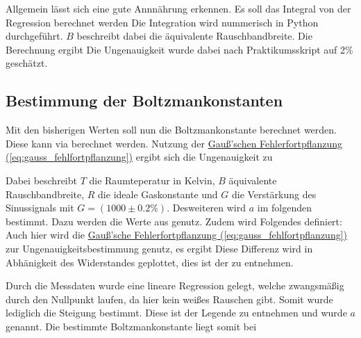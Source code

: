 Allgemein lässt sich eine gute Annnährung erkennen. Es soll das Integral von der Regression berechnet werden
Die Integration wird nummerisch in Python durchgeführt. $B$ beschreibt dabei die äquivalente Rauschbandbreite. Die Berechnung ergibt
Die Ungenauigkeit wurde dabei nach Praktikumsskript auf 2\% geschätzt. \cite{skriptPAP22}

\subsection{Bestimmung der Boltzmankonstanten}
Mit den bisherigen Werten soll nun die Boltzmankonstante berechnet werden.
Diese kann via 
berechnet werden. Nutzung der \hyperref[eq:gauss_fehlfortpflanzung]{Gauß'schen Fehlerfortpflanzung (\ref*{eq:gauss_fehlfortpflanzung})} ergibt sich die Ungenauigkeit zu

Dabei beschreibt $T$ die Raumteperatur in Kelvin, $B$ äquivalente Rauschbandbreite, $R$ die ideale Gaskonstante und $G$ die Verstärkung des Sinussignals mit $G = (1000 \pm 0.2\%)$. Desweiteren wird $a$ im folgenden bestimmt.
Dazu werden die Werte aus  genutz. Zudem wird Folgendes definiert:  
Auch hier wird die \hyperref[eq:gauss_fehlfortpflanzung]{Gauß'sche Fehlerfortpflanzung (\ref*{eq:gauss_fehlfortpflanzung})} zur Ungenauigkeitsbestimmung genutz, es ergibt
Diese Differenz wird in Abhänigkeit des Widerstandes geplottet, dies ist der  zu entnehmen. 

Durch die Messdaten wurde eine lineare Regression gelegt, welche zwangsmäßig durch den Nullpunkt laufen, da hier kein weißes Rauschen gibt. Somit wurde lediglich die Steigung bestimmt. Diese ist der Legende zu entnehmen und wurde $a$ genannt.
Die bestimmte Boltzmankonstante liegt somit bei 

